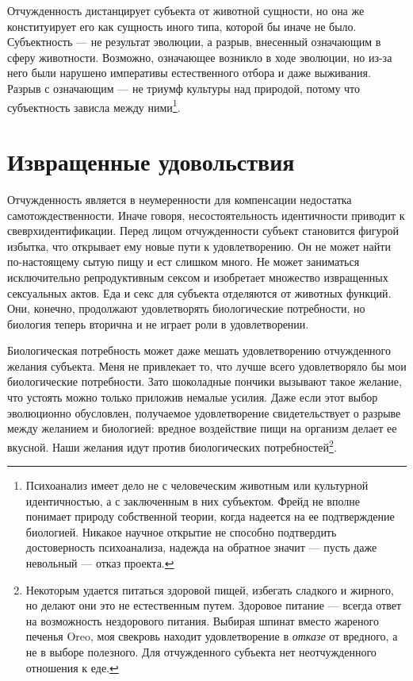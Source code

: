 \documentclass[12pt]{book}
\begin{document}
Отчужденность дистанцирует субъекта от животной сущности, но она же конституирует его как сущность иного типа, которой бы иначе не было. Субъектность --- не результат эволюции, а разрыв, внесенный означающим в сферу животности. Возможно, означающее возникло в ходе эволюции, но из-за него были нарушено императивы естественного отбора и даже выживания. Разрыв с означающим --- не триумф культуры над природой, потому что субъектность зависла между ними\footnote{Психоанализ имеет дело не с человеческим животным или культурной идентичностью, а с заключенным в них субъектом. Фрейд не вполне понимает природу собственной теории, когда надеется на ее подтверждение биологией. Никакое научное открытие не способно подтвердить достоверность психоанализа, надежда на обратное значит --- пусть даже невольный --- отказ проекта.}.

\section{Извращенные удовольствия}

Отчужденность является в неумеренности для компенсации недостатка самотождественности. Иначе говоря, несостоятельность идентичности приводит к свеврхидентификации. Перед лицом отчужденности субъект становится фигурой избытка, что открывает ему новые пути к удовлетворению. Он не может найти по-настоящему сытую пищу и ест слишком много. Не может заниматься исключительно репродуктивным сексом и изобретает множество извращенных сексуальных актов. Еда и секс для субъекта отделяются от животных функций. Они, конечно, продолжают удовлетворять биологические потребности, но биология теперь вторична и не играет роли в удовлетворении.

Биологическая потребность может даже мешать удовлетворению отчужденного желания субъекта. Меня не привлекает то, что лучше всего удовлетворяло бы мои биологические потребности. Зато шоколадные пончики вызывают такое желание, что устоять можно только приложив немалые усилия. Даже если этот выбор эволюционно обусловлен, получаемое удовлетворение свидетельствует о разрыве между желанием и биологией: вредное воздействие пищи на организм делает ее вкусной. Наши желания идут против биологических потребностей\footnote{Некоторым удается питаться здоровой пищей, избегать сладкого и жирного, но делают они это не естественным путем. Здоровое питание --- всегда ответ на возможность нездорового питания. Выбирая шпинат вместо жареного печенья Oreo, моя свекровь находит удовлетворение в \textit{отказе} от вредного, а не в выборе полезного. Для отчужденного субъекта нет неотчужденного отношения к еде.}.
\end{document}
